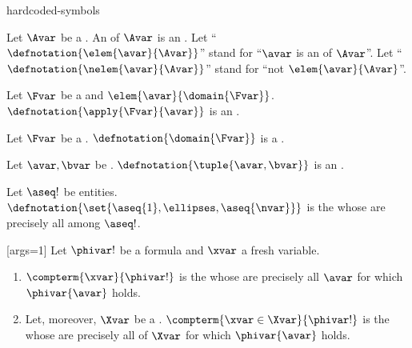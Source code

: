 \documentclass{stex}
\begin{document}
\begin{smodule}[creators={Marcel Schütz}]{hardcoded-symbols}
  \begin{sdefinition}[for={elem,nelem}]
    Let $\Avar$ be a .
    An  of $\Avar$ is an .
    Let “$\defnotation{\elem{\avar}{\Avar}}$” stand for “$\avar$ is an  of $\Avar$”.
    Let “$\defnotation{\nelem{\avar}{\Avar}}$” stand for “not $\elem{\avar}{\Avar}$”.
  \end{sdefinition}

  \begin{sdefinition}[for={apply}]
    Let $\Fvar$ be a  and $\elem{\avar}{\domain{\Fvar}}$.
    $\defnotation{\apply{\Fvar}{\avar}}$ is an .
  \end{sdefinition}

  \begin{sdefinition}[for={domain}]
    Let $\Fvar$ be a .
    $\defnotation{\domain{\Fvar}}$ is a .
  \end{sdefinition}

  \begin{sdefinition}[for={tuple}]
    Let $\avar,\bvar$ be .
    $\defnotation{\tuple{\avar,\bvar}}$ is an .
  \end{sdefinition}

  \begin{sdefinition}[for={set}]
    Let $\aseq!$ be entities.
    $\defnotation{\set{\aseq{1},\ellipses,\aseq{\nvar}}}$ is the  whose  are precisely all  among $\aseq!$.
  \end{sdefinition}

  \begin{sdefinition}[for={compterm}]
    [args=1]{\maincomp{\varphi}}
    Let $\phivar!$ be a formula and $\xvar$ a fresh variable.
    \begin{enumerate}
      \item $\compterm{\xvar}{\phivar!}$ is the  whose  are precisely all  $\avar$ for which $\phivar{\avar}$ holds.
      \item Let, moreover, $\Xvar$ be a .
      $\compterm{\xvar \in \Xvar}{\phivar!}$ is the  whose  are precisely all  of $\Xvar$ for which $\phivar{\avar}$ holds.
    \end{enumerate}
  \end{sdefinition}


\end{smodule}
\end{document}
